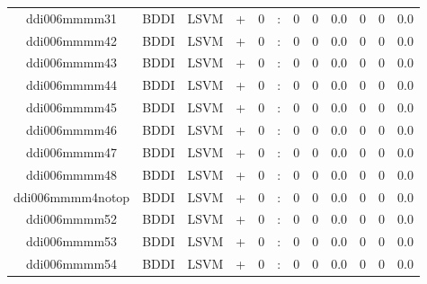 \documentclass[a4paper]{article}
\begin{document}
\begin{landscape}
\begin{center}
\begin{tabular}{ |c|c|c|c|c|c|c|c|c|c|c|c|}
 
 	
 	\small{ ddi006mmmm31 } & BDDI & LSVM & +  &  0 &  :  &  0 & 0 & 0.0  &  0 & 0 & 0.0 \\
 	

 
 	
 	\small{ ddi006mmmm42 } & BDDI & LSVM & +  &  0 &  :  &  0 & 0 & 0.0  &  0 & 0 & 0.0 \\
 	

 
 	
 	\small{ ddi006mmmm43 } & BDDI & LSVM & +  &  0 &  :  &  0 & 0 & 0.0  &  0 & 0 & 0.0 \\
 	

 
 	
 	\small{ ddi006mmmm44 } & BDDI & LSVM & +  &  0 &  :  &  0 & 0 & 0.0  &  0 & 0 & 0.0 \\
 	

 
 	
 	\small{ ddi006mmmm45 } & BDDI & LSVM & +  &  0 &  :  &  0 & 0 & 0.0  &  0 & 0 & 0.0 \\
 	

 
 	
 	\small{ ddi006mmmm46 } & BDDI & LSVM & +  &  0 &  :  &  0 & 0 & 0.0  &  0 & 0 & 0.0 \\
 	

 
 	
 	\small{ ddi006mmmm47 } & BDDI & LSVM & +  &  0 &  :  &  0 & 0 & 0.0  &  0 & 0 & 0.0 \\
 	

 
 	
 	\small{ ddi006mmmm48 } & BDDI & LSVM & +  &  0 &  :  &  0 & 0 & 0.0  &  0 & 0 & 0.0 \\
 	

 
 	
 	\small{ ddi006mmmm4notop } & BDDI & LSVM & +  &  0 &  :  &  0 & 0 & 0.0  &  0 & 0 & 0.0 \\
 	

 
 	
 	\small{ ddi006mmmm52 } & BDDI & LSVM & +  &  0 &  :  &  0 & 0 & 0.0  &  0 & 0 & 0.0 \\
 	

 
 	
 	\small{ ddi006mmmm53 } & BDDI & LSVM & +  &  0 &  :  &  0 & 0 & 0.0  &  0 & 0 & 0.0 \\
 	

 
 	
 	\small{ ddi006mmmm54 } & BDDI & LSVM & +  &  0 &  :  &  0 & 0 & 0.0  &  0 & 0 & 0.0 \\
 	


\end{tabular}
\end{center}
\end{landscape}
\end{document}
